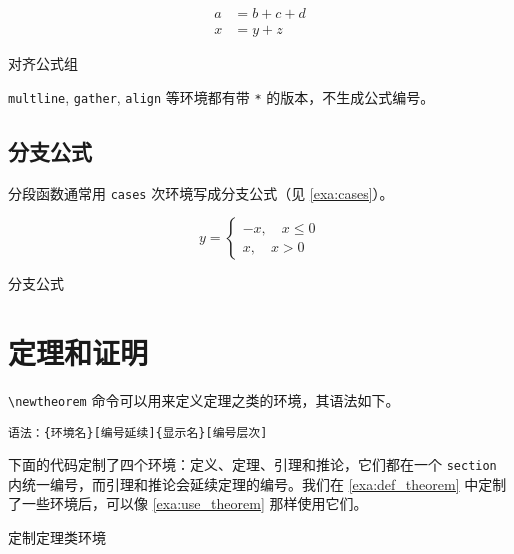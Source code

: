 \begin{example}[!h]
\begin{RLDemo}[]
\begin{align}
a &= b+c+d \\
x &= y+z
\end{align}
\end{RLDemo}
\caption{对齐公式组}
\label{exa:align}
\end{example}

\texttt{multline}, \texttt{gather}, \texttt{align} 等环境都有带 \texttt{*} 的版本，不生成公式编号。

\subsection{分支公式}

分段函数通常用 \texttt{cases} 次环境写成分支公式（见 \autoref{exa:cases}）。

\begin{example}[htbp]
\begin{RLDemo}[]
\[ y=\begin{cases}
  -x,\quad x\leq 0 \\
  x,\quad x>0
\end{cases} \]
\end{RLDemo}
\caption{分支公式}
\label{exa:cases}
\end{example}

\section{定理和证明}

\verb|\newtheorem| 命令可以用来定义定理之类的环境，其语法如下。

\verb|语法：{环境名}[编号延续]{显示名}[编号层次]|

下面的代码定制了四个环境：定义、定理、引理和推论，它们都在一个 \texttt{section} 内统一编号，而引理和推论会延续定理的编号。我们在 \autoref{exa:def_theorem} 中定制了一些环境后，可以像 \autoref{exa:use_theorem} 那样使用它们。

\begin{example}[htbp]
\begin{Code}[]
\newtheorem{definition}{`定义`}[section]
\newtheorem{theorem}{`定理`}[section]
\newtheorem{lemma}[theorem]{`引理`}
\newtheorem{corollary}[theorem]{`推论`}
\end{Code}
\caption{定制定理类环境}
\label{exa:def_theorem}
\end{example}

\newtheorem{definition}{定义}[section]
\newtheorem{theorem}{定理}[section]
\newtheorem{lemma}[theorem]{引理}
\newtheorem{corollary}[theorem]{推论}

